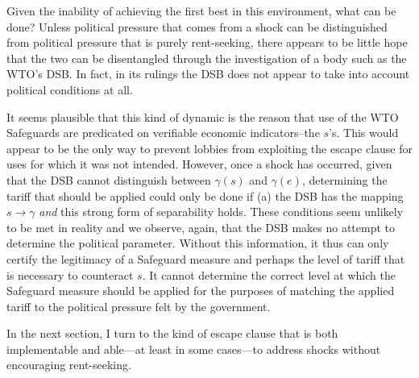\documentclass[12pt,titlepage]{article}
\newcommand{\ga}{\gamma}
\begin{document}
Given the inability of achieving the first best in this environment, what can be done? Unless political pressure that comes from a shock can be distinguished from political pressure that is purely rent-seeking, there appears to be little hope that the two can be disentangled through the investigation of a body such as the WTO's DSB. In fact, in its rulings the DSB does not appear to take into account political conditions at all.

It seems plausible that this kind of dynamic is the reason that use of the WTO Safeguards are predicated on verifiable economic indicators--the $s$'s. This would appear to be the only way to prevent lobbies from exploiting the escape clause for uses for which it was not intended. However, once a shock has occurred, given that the DSB cannot distinguish between $\ga(s)$ and $\ga(e)$, determining the tariff that should be applied could only be done if (a) the DSB has the mapping $s \rightarrow \ga$ \textit{and} this strong form of separability holds. These conditions seem unlikely to be met in reality and we observe, again, that the DSB makes no attempt to determine the political parameter. Without this information, it thus can only certify the legitimacy of a Safeguard measure and perhaps the level of tariff that is necessary to counteract $s$. It cannot determine the correct level at which the Safeguard measure should be applied for the purposes of matching the applied tariff to the political pressure felt by the government.

In the next section, I turn to the kind of escape clause that is both implementable and able---at least in some cases---to address shocks without encouraging rent-seeking.
\end{document}
